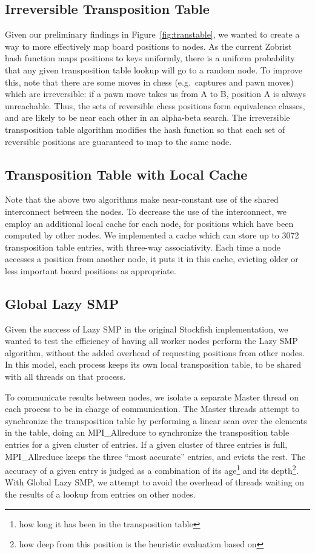 \documentclass{article}
\begin{document}
\subsection{Irreversible Transposition Table}
Given our preliminary findings in Figure~\ref{fig:transtable}, we wanted to
create a way to more effectively map board positions to nodes. As the current
Zobrist hash function maps positions to keys uniformly, there is a uniform
probability that any given transposition table lookup will go to a random node.
To improve this, note that there are some moves in chess (e.g.\ captures and pawn
moves) which are irreversible: if a pawn move takes us from A to B, position A
is always unreachable. Thus, the sets of reversible chess positions form
equivalence classes, and are likely to be near each other in an alpha-beta
search. The irreversible transposition table algorithm modifies the hash
function so that each set of reversible positions are guaranteed to map to the
same node.

\subsection{Transposition Table with Local Cache}
Note that the above two algorithms make near-constant use of the shared
interconnect between the nodes. To decrease the use of the interconnect, we
employ an additional local cache for each node, for positions which have been
computed by other nodes. We implemented a cache which can store up to 3072
transposition table entries, with three-way associativity. Each time a node
accesses a position from another node, it puts it in this cache, evicting older
or less important board positions as appropriate.

\subsection{Global Lazy SMP}
Given the success of Lazy SMP in the original Stockfish implementation, we
wanted to test the efficiency of having all worker nodes perform the Lazy SMP
algorithm, without the added overhead of requesting positions from other nodes.
In this model, each process keeps its own local transposition table, to be
shared with all threads on that process.

To communicate results between nodes,
we isolate a separate Master thread on each process to be in charge of
communication. The Master threads attempt to synchronize the transposition table
by performing a linear scan over the elements in the table, doing an
{MPI\_Allreduce} to synchronize the transposition table entries for a given
cluster of entries. If a given cluster of three entries is full, {MPI\_Allreduce}
keeps the three ``most accurate'' entries, and evicts the rest. The accuracy of
a given entry is judged as a combination of its age\footnote{how long it has
been in the transposition table} and its depth\footnote{how deep from this
position is the heuristic evaluation based on}. With Global Lazy SMP, we
attempt to avoid the overhead of threads waiting on the results of a lookup from
entries on other nodes.
\end{document}

